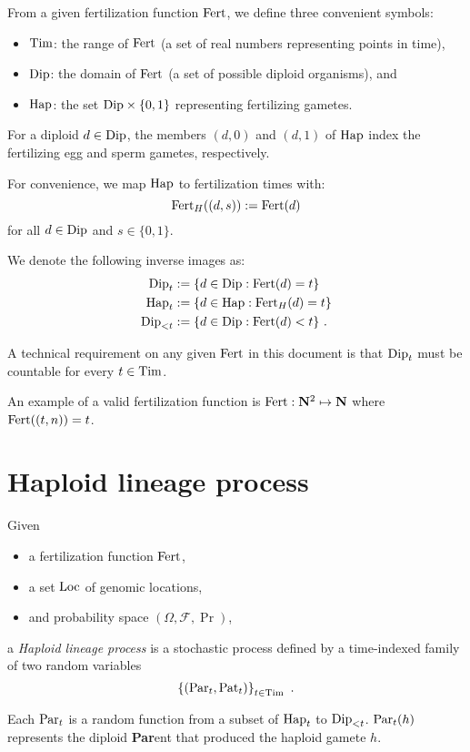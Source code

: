 From a given fertilization function $\mathrm{Fert}$, we define three convenient symbols:
\begin{itemize}
\item
  $\mathrm{Tim}$: the range of $\mathrm{Fert}$ (a set of real numbers representing points in time),
\item
  $\mathrm{Dip}$: the domain of $\mathrm{Fert}$ (a set of possible diploid organisms), and
\item
  $\mathrm{Hap}$: the set $\mathrm{Dip} \times \{0, 1 \}$ representing fertilizing gametes.
\end{itemize}

For a diploid $d \in \mathrm{Dip}$, the members $(d, 0)$ and $(d, 1)$ of $\mathrm{Hap}$ index the
fertilizing egg and sperm gametes, respectively.

For convenience, we map $\mathrm{Hap}$ to fertilization times with:
$$
  \mathrm{Fert}_H((d, s)) := \mathrm{Fert}(d)
$$
for all $d \in \mathrm{Dip}$ and $s \in \{0, 1\}$.

We denote the following inverse images as:
$$
\begin{aligned}
\mathrm{Dip}_t & := \{ d \in \mathrm{Dip} : \mathrm{Fert}(d) = t \}  \\
\mathrm{Hap}_t & := \{ d \in \mathrm{Hap} : \mathrm{Fert}_H(d) = t \}  \\
\mathrm{Dip}_{<t} & := \{ d \in \mathrm{Dip} : \mathrm{Fert}(d) < t \}
\text{ .}
\end{aligned}
$$

A technical requirement on any given $\mathrm{Fert}$ in this document is that $\mathrm{Dip}_t$ must be
countable for every $t \in \mathrm{Tim}$.

An example of a valid fertilization function is $\mathrm{Fert} : \mathbf{N}^2 \mapsto \mathbf{N}$
where $\mathrm{Fert}( (t, n) ) = t$.


\section{Haploid lineage process}

Given 
\begin{itemize}
\item
  a fertilization function $\mathrm{Fert}$,
\item
  a set $\mathrm{Loc}$ of genomic locations,
\item
  and probability space $(\Omega, \mathcal{F}, \Pr)$,
\end{itemize}
a \emph{Haploid lineage process} is a stochastic process defined by a time-indexed
family of two random variables
$$
 \left\{ (\mathrm{Par}_t, \mathrm{Pat}_t) \right\}_{t \in \mathrm{Tim}}
\text{ .}
$$

Each $\mathrm{Par}_t$ is a random function from a subset of $\mathrm{Hap}_t$ to $\mathrm{Dip}_{<t}$.
$\mathrm{Par}_t(h)$ represents the diploid \textbf{Par}ent that produced the haploid gamete $h$.

